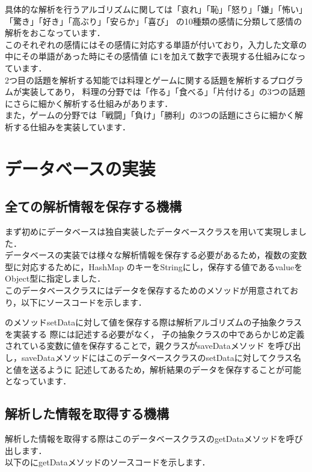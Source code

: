 具体的な解析を行うアルゴリズムに関しては「哀れ」「恥」「怒り」「嫌」「怖い」「驚き」「好き」「高ぶり」「安らか」「喜び」
の10種類の感情に分類して感情の解析をおこなっています．\\

このそれぞれの感情にはその感情に対応する単語が付いており，入力した文章の中にその単語があった時にその感情値
に1を加えて数字で表現する仕組みになっています．\\
2つ目の話題を解析する知能では料理とゲームに関する話題を解析するプログラムが実装してあり，
料理の分野では「作る」「食べる」「片付ける」の3つの話題にさらに細かく解析する仕組みがあります．
\\
また，ゲームの分野では「戦闘」「負け」「勝利」の3つの話題にさらに細かく解析する仕組みを実装しています．
\\


\section{データベースの実装}
\subsection{全ての解析情報を保存する機構}
まず初めにデータベースは独自実装したデータベースクラスを用いて実現しました．
\\
データベースの実装では様々な解析情報を保存する必要があるため，複数の変数型に対応するために，HashMap
のキーをStringにし，保存する値であるvalueをObject型に指定しました．
\\
このデータベースクラスにはデータを保存するためのメソッドが用意されており，以下にソースコードを示します．
\\

のメソッドsetDataに対して値を保存する際は解析アルゴリズムの子抽象クラスを実装する
際には記述する必要がなく，
子の抽象クラスの中であらかじめ定義されている変数に値を保存することで，親クラスがsaveDataメソッド
を呼び出し，saveDataメソッドにはこのデータベースクラスのsetDataに対してクラス名と値を送るように
記述してあるため，解析結果のデータを保存することが可能となっています．
\\
\subsection{解析した情報を取得する機構}
解析した情報を取得する際はこのデータベースクラスのgetDataメソッドを呼び出します．
\\
以下のにgetDataメソッドのソースコードを示します．


